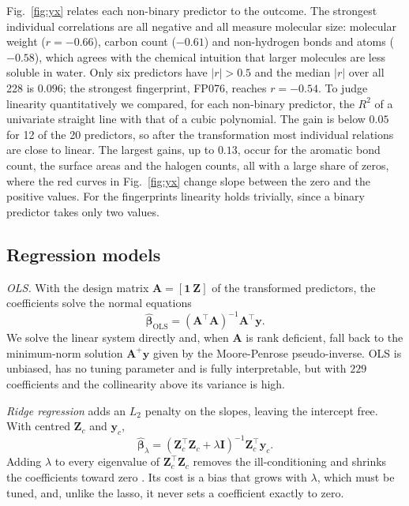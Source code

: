 \documentclass[conference]{IEEEtran}
\begin{document}
Fig.~\ref{fig:yx} relates each non-binary predictor to the outcome. The
strongest individual correlations are all negative and all measure
molecular size: molecular weight ($r=-0.66$), carbon count ($-0.61$)
and non-hydrogen bonds and atoms ($-0.58$), which agrees with the
chemical intuition that larger molecules are less soluble in water.
Only six predictors have $|r| > 0.5$ and the median $|r|$ over all 228
is $0.096$; the strongest fingerprint, FP076, reaches $r = -0.54$. To
judge linearity quantitatively we compared, for each non-binary
predictor, the $R^2$ of a univariate straight line with that of a cubic
polynomial. The gain is below $0.05$ for 12 of the 20 predictors, so
after the transformation most individual relations are close to linear.
The largest gains, up to $0.13$, occur for the aromatic bond count, the
surface areas and the halogen counts, all with a large share of zeros,
where the red curves in Fig.~\ref{fig:yx} change slope between the
zero and the positive values. For the fingerprints linearity holds
trivially, since a binary predictor takes only two values.

\subsection{Regression models}
\label{subsec:models}

\emph{OLS.} With the design matrix $\mathbf{A}=[\mathbf{1}\ \mathbf{Z}]$
of the transformed predictors, the coefficients solve the normal
equations
\begin{equation}
\hat{\boldsymbol\beta}_{\mathrm{OLS}} =
(\mathbf{A}^\top\mathbf{A})^{-1}\mathbf{A}^\top\mathbf{y}.
\label{eq:ols}
\end{equation}
We solve the linear system directly and, when $\mathbf{A}$ is rank
deficient, fall back to the minimum-norm solution
$\mathbf{A}^{+}\mathbf{y}$ given by the Moore-Penrose pseudo-inverse.
OLS is unbiased, has no tuning parameter and is fully interpretable,
but with $229$ coefficients and the collinearity above its variance is
high.

\emph{Ridge regression} adds an $L_2$ penalty on the slopes, leaving
the intercept free. With centred $\mathbf{Z}_c$ and $\mathbf{y}_c$,
\begin{equation}
\hat{\boldsymbol\beta}_{\lambda} =
(\mathbf{Z}_c^\top\mathbf{Z}_c + \lambda\mathbf{I})^{-1}
\mathbf{Z}_c^\top\mathbf{y}_c .
\label{eq:ridge}
\end{equation}
Adding $\lambda$ to every eigenvalue of $\mathbf{Z}_c^\top\mathbf{Z}_c$
removes the ill-conditioning and shrinks the coefficients toward zero
\cite{hoerl1970}. Its cost is a bias that grows with $\lambda$, which
must be tuned, and, unlike the lasso, it never sets a coefficient
exactly to zero.
\end{document}
